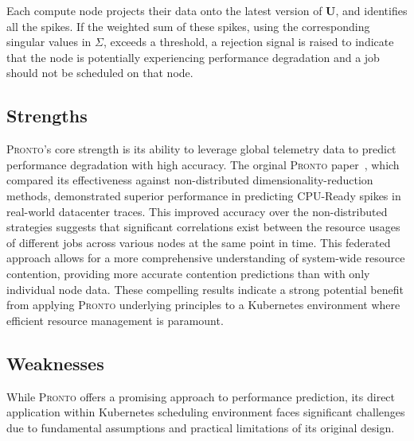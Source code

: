 Each compute node projects their data onto the latest version of $\textbf{U}$,
and identifies all the spikes. If the weighted sum of these spikes, using the
corresponding singular values in $\Sigma$, exceeds a threshold, a rejection
signal is raised to indicate that the node is potentially experiencing
performance degradation and a job should not be scheduled on that node.

\subsection{Strengths}
\textsc{Pronto}'s core strength is its ability to leverage global telemetry data
to predict performance degradation with high accuracy. The orginal
\textsc{Pronto} paper~\cite{grammenos_pronto_2021}, which compared its
effectiveness against non-distributed dimensionality-reduction methods,
demonstrated superior performance in predicting CPU-Ready spikes in real-world
datacenter traces. This improved accuracy over the non-distributed
strategies suggests that significant correlations exist between the resource
usages of different jobs across various nodes at the same point in time. This
federated approach allows for a more comprehensive understanding of system-wide
resource contention, providing more accurate contention predictions than with
only individual node data. These compelling results indicate a strong potential
benefit from applying \textsc{Pronto} underlying principles to a Kubernetes
environment where efficient resource management is paramount.

\subsection{Weaknesses}
\label{sec:intro-weakness}
While \textsc{Pronto} offers a promising approach to performance prediction, its
direct application within Kubernetes scheduling environment faces significant
challenges due to fundamental assumptions and practical limitations of its
original design.

